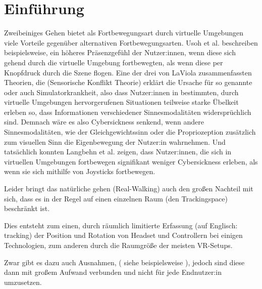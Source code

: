 
\chapter{Einführung}\label{chapter:intro}

Zweibeiniges Gehen bietet als Fortbewegungsart durch virtuelle Umgebungen viele Vorteile gegenüber alternativen Fortbewegungsarten. Usoh et al. \cite{usoh-vergleich-1999} beschreiben beispielsweise, ein höheres Präsenzgefühl der Nutzer:innen, wenn diese sich gehend durch die virtuelle Umgebung fortbewegten, als wenn diese per Knopfdruck durch die Szene flogen.
Eine der drei von LaViola \cite{cybersickness} zusammenfassten Theorien, die  (Sensorische Konflikt Theorie) erklärt die Ursache für so genannte  oder auch Simulatorkrankheit, also dass Nutzer:innen in bestimmten, durch virtuelle Umgebungen hervorgerufenen Situationen teilweise starke Übelkeit erleben so, dass Informationen verschiedener Sinnesmodalitäten widersprüchlich sind.
Demnach wäre es also Cybersickness senkend, wenn andere Sinnesmodalitäten, wie der Gleichgewichtssinn oder die Propriozeption zusätzlich zum visuellen Sinn die Eigenbewegung der Nutzer:in wahrnehmen. Und tatsächlich konnten Langbehn et al. \cite{langbehn-vergleich-2018} zeigen, dass Nutzer:innen, die sich in virtuellen Umgebungen fortbewegen signifikant weniger Cybersickness erleben, als wenn sie sich mithilfe von Joysticks fortbewegen.

Leider bringt das natürliche gehen (Real-Walking) auch den großen Nachteil mit sich, dass es in der Regel auf einen einzelnen Raum (den Trackingspace) beschränkt ist.

Dies entsteht zum einen, durch räumlich limitierte Erfassung (auf Englisch: tracking) der Position und Rotation von Headset und Controllern bei einigen Technologien, zum anderen durch die Raumgröße der meisten VR-Setups.

Zwar gibt es dazu auch Ausnahmen, ( siehe beispielsweise \cite{microsoft}
), jedoch sind diese dann mit großem Aufwand verbunden und nicht für jede Endnutzer:in umzusetzen.

